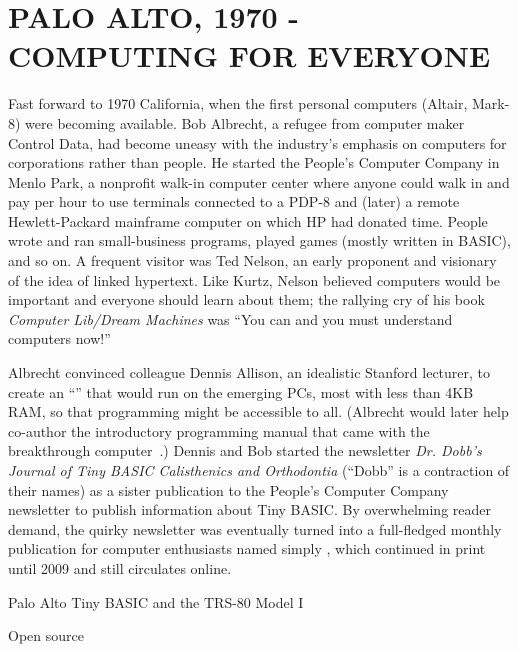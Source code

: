 
\section{PALO ALTO, 1970 - COMPUTING FOR EVERYONE}


Fast forward to 1970 California, when the first personal computers (Altair,
Mark-8) were becoming available.  Bob Albrecht, a refugee from computer
maker Control
Data, had become uneasy with the industry's emphasis on computers for
corporations rather than people.  He 
started the People's Computer Company in Menlo Park, a nonprofit walk-in
computer center where anyone could walk in and pay per hour to use
terminals connected to a PDP-8 and (later) a remote Hewlett-Packard
mainframe computer on which 
HP had donated time.  People wrote and ran small-business programs, played games
(mostly written in BASIC), and so on.
A frequent visitor was Ted Nelson, an early proponent and visionary of
the idea of linked hypertext.  Like Kurtz, Nelson believed computers
would be important and everyone should learn about them; the rallying
cry of his book \emph{Computer Lib/Dream Machines} was ``You can and
you must understand computers now!''

Albrecht convinced colleague Dennis Allison, an idealistic Stanford
lecturer, to create an  ``'' that would run
on the emerging PCs, most with less than 4KB RAM, so that programming
might be accessible to all.  (Albrecht would later help co-author the introductory programming manual
that came with the breakthrough 
computer~\cite{commodore}.) 
Dennis and Bob started the newsletter \emph{Dr. Dobb's Journal of Tiny BASIC
Calisthenics and Orthodontia} (``Dobb'' is a contraction of their names)
as a sister publication to the People's Computer Company newsletter to
publish information about Tiny BASIC.
By overwhelming reader demand, the quirky newsletter was eventually
turned into a full-fledged monthly publication for computer enthusiasts
named simply , which continued in print
until 2009 and still circulates online.

Palo Alto Tiny BASIC and the TRS-80 Model I

\begin{milestone}{Open source}

\end{milestone}
